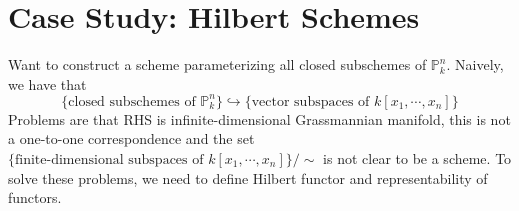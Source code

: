 \documentclass{ctexart}
\begin{document}
\section{Case Study: Hilbert Schemes}
\label{section:Case Study: Hilbert Schemes}

Want to construct a scheme parameterizing all closed subschemes of $\mathbb{P}_{k}^{n}$.
Naively, we have that 
\begin{equation*}
    \{\text{closed subschemes of $\mathbb{P}_{k}^{n}$}\} \hookrightarrow \{\text{vector subspaces of $k[x_{1}, \cdots, x_{n}]$}\}
\end{equation*}
Problems are that RHS is infinite-dimensional Grassmannian manifold, this is not a one-to-one correspondence and the set $\{\text{finite-dimensional subspaces of $k[x_{1}, \cdots, x_{n}]$}\}/\sim$ is not clear to be a scheme.
To solve these problems, we need to define Hilbert functor and representability of functors.
\end{document}
